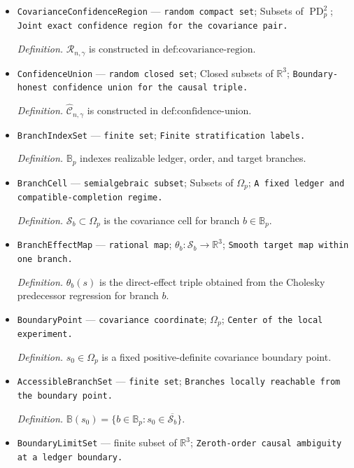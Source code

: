 \documentclass{article}
\begin{document}
\begin{itemize}
  \item \texttt{CovarianceConfidenceRegion} --- \texttt{random compact set}; Subsets of \(\operatorname{PD}_p^2\); \texttt{Joint exact confidence region for the covariance pair.}
  \par\smallskip\noindent\emph{Definition.} \(\mathcal R_{n,\gamma}\) is constructed in \(\text{def:covariance-region}\).
  \item \texttt{ConfidenceUnion} --- \texttt{random closed set}; Closed subsets of \(\mathbb R^3\); \texttt{Boundary-\allowbreak{}honest confidence union for the causal triple.}
  \par\smallskip\noindent\emph{Definition.} \(\widehat{\mathcal C}_{n,\gamma}\) is constructed in \(\text{def:confidence-union}\).
  \item \texttt{BranchIndexSet} --- \texttt{finite set}; \texttt{Finite stratification labels.}
  \par\smallskip\noindent\emph{Definition.} \(\mathbb B_p\) indexes realizable ledger, order, and target branches.
  \item \texttt{BranchCell} --- \texttt{semialgebraic subset}; Subsets of \(\Omega_p\); \texttt{A fixed ledger and compatible-\allowbreak{}completion regime.}
  \par\smallskip\noindent\emph{Definition.} \(\mathcal S_b\subset\Omega_p\) is the covariance cell for branch \(b\in\mathbb B_p\).
  \item \texttt{BranchEffectMap} --- \texttt{rational map}; \(\theta_b:\mathcal S_b\to\mathbb R^3\); \texttt{Smooth target map within one branch.}
  \par\smallskip\noindent\emph{Definition.} \(\theta_b(s)\) is the direct-effect triple obtained from the Cholesky predecessor regression for branch \(b\).
  \item \texttt{BoundaryPoint} --- \texttt{covariance coordinate}; \(\Omega_p\); \texttt{Center of the local experiment.}
  \par\smallskip\noindent\emph{Definition.} \(s_0\in\Omega_p\) is a fixed positive-definite covariance boundary point.
  \item \texttt{AccessibleBranchSet} --- \texttt{finite set}; \texttt{Branches locally reachable from the boundary point.}
  \par\smallskip\noindent\emph{Definition.} \(\mathbb B(s_0)=\{b\in\mathbb B_p:s_0\in\overline{\mathcal S_b}\}\).
  \item \texttt{BoundaryLimitSet} --- finite subset of \(\mathbb R^3\); \texttt{Zeroth-\allowbreak{}order causal ambiguity at a ledger boundary.}

\end{itemize}
\end{document}
